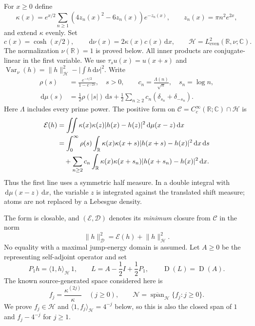 \documentclass[11pt,a4paper]{article}
\newcommand{\R}{\mathbb R}
\newcommand{\C}{\mathbb C}
\newcommand{\HH}{\mathcal H}
\newcommand{\DD}{\mathcal D}
\newcommand{\EE}{\mathcal E}
\newcommand{\CC}{\mathcal C}
\newcommand{\NN}{\mathcal N}
\newcommand{\ip}[2]{\langle #1,#2\rangle}
\newcommand{\norm}[1]{\lVert #1\rVert}
\newcommand{\abs}[1]{\lvert #1\rvert}
\newcommand{\dd}{\,\mathrm d}
\newcommand{\Var}{\operatorname{Var}}
\newcommand{\Dom}{\operatorname{D}}
\theoremstyle{definition}
\theoremstyle{remark}
\numberwithin{equation}{section}
\begin{document}
For $x\ge0$ define
\begin{equation}\label{eq:kappa}
 \kappa(x)=e^{x/2}\sum_{n\ge1}(4z_n(x)^2-6z_n(x))e^{-z_n(x)},
 \qquad z_n(x)=\pi n^2e^{2x},
\end{equation}
and extend $\kappa$ evenly. Set
\begin{equation}\label{eq:weight}
 c(x)=\cosh(x/2),\qquad
 \dd\nu(x)=2\kappa(x)c(x)\dd x,\qquad
 \HH=L^2_{\mathrm{even}}(\R,\nu;\C).
\end{equation}
The normalization $\nu(\R)=1$ is proved below. All inner products are
conjugate-linear in the first variable. We use
$\tau_su(x)=u(x+s)$ and
$\Var_\nu(h)=\norm h_{\HH}^2-\abs{\int h\dd\nu}^2$. Write
\begin{equation}\label{eq:measure}
 \begin{split}
 \rho(s)&=\frac{e^{-s/2}}{1-e^{-2s}},\quad s>0,\qquad
 c_n=\frac{\Lambda(n)}{\sqrt n},\quad s_n=\log n,\\
 \dd\mu(s)&=\frac12\rho(\abs{s})\dd s
       +\frac12\sum_{n\ge2}c_n(\delta_{s_n}+\delta_{-s_n}).
 \end{split}
\end{equation}
Here $\Lambda$ includes every prime power. The positive form on
$\CC=C_c^\infty(\R;\C)\cap\HH$ is
\begin{align}\label{eq:energy}
 \EE(h)
 &=\iint\kappa(x)\kappa(z)\abs{h(x)-h(z)}^2
                 \dd\mu(x-z)\dd x\notag\\
 &=\int_0^\infty\rho(s)\int_\R\kappa(x)\kappa(x+s)
                   \abs{h(x+s)-h(x)}^2\dd x\dd s\notag\\
 &\quad+\sum_{n\ge2}c_n\int_\R\kappa(x)\kappa(x+s_n)
                   \abs{h(x+s_n)-h(x)}^2\dd x.
\end{align}
Thus the first line uses a symmetric half measure. In a double integral
with $\dd\mu(x-z)\dd x$, the variable $z$ is integrated against the translated
shift measure; atoms are not replaced by a Lebesgue density.

The form is closable, and $(\EE,\DD)$ denotes its \emph{minimum} closure
from $\CC$ in the norm
\begin{equation}\label{eq:form-norm}
 \norm h_{\DD}^2=\EE(h)+\norm h_{\HH}^2.
\end{equation}
No equality with a maximal jump-energy domain is assumed. Let $A\ge0$ be
the representing self-adjoint operator and set
\begin{equation}\label{eq:L}
 P_1h=\ip1h_{\HH}\,1,\qquad
 L=A-\frac12I+\frac12P_1,\qquad \Dom(L)=\Dom(A).
\end{equation}
The known source-generated space considered here is
\begin{equation}\label{eq:N}
 f_j=\frac{\kappa^{(2j)}}{\kappa}\quad(j\ge0),\qquad
 \NN=\overline{\operatorname{span}}_{\HH}\{f_j:j\ge0\}.
\end{equation}
We prove $f_j\in\HH$ and $\ip1{f_j}_{\HH}=4^{-j}$ below, so this is also
the closed span of $1$ and $f_j-4^{-j}$ for $j\ge1$.
\end{document}
